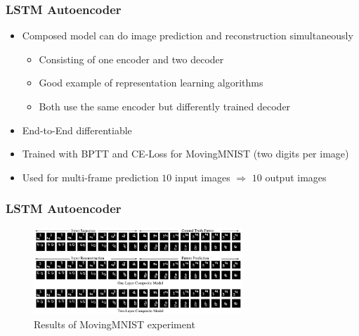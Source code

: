   \begin{frame}
   \frametitle{LSTM Autoencoder}  
  
   \begin{itemize}
    \item<1-> Composed model can do image prediction and reconstruction simultaneously
    \begin{itemize}
     \item<2-> Consisting of one encoder and two decoder
     \item<3-> Good example of representation learning algorithms
     \item<4-> Both use the same encoder but differently trained decoder
    \end{itemize}
    \item<5-> End-to-End differentiable
    \item<6-> Trained with BPTT and CE-Loss for MovingMNIST (two digits per image)
    \item<7-> Used for multi-frame prediction $10$ input images $\Rightarrow$ $10$ output images
   \end{itemize}
  
  \end{frame}
  \begin{frame}
   \frametitle{LSTM Autoencoder}  
  
   \begin{figure}[H]
    \includegraphics[width=0.7\textwidth]{../Images/srivastava_results_mnist.png}
    \centering
    \caption{Results of MovingMNIST experiment \citep{Srivastava2015}}
    \label{fig:lstm_results_mnist}
   \end{figure}
  
  \end{frame}
 
